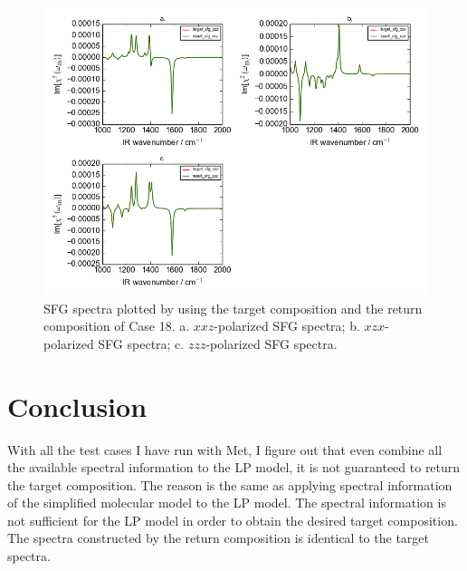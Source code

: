 \begin{figure}[!ht] 
\centering
\includegraphics[scale=0.7]{Figures/chapter4_result_target_plotting_500datapoint_sfg_version2.png}
\caption{SFG spectra plotted by using the target composition and the return composition of Case 18. a. $xxz$-polarized SFG spectra; b. $xzx$-polarized SFG spectra; c. $zzz$-polarized SFG spectra.} \label{fig:4.7}
\end{figure} 

\section{Conclusion}
With all the test cases I have run with Met, I figure out that even combine all the available spectral information to the LP model, it is not guaranteed to return the target composition. The reason is the same as applying spectral information of the simplified molecular model to the LP model. The spectral information is not sufficient for the LP model in order to obtain the desired target composition. The spectra constructed by the return composition is identical to the target spectra. 









